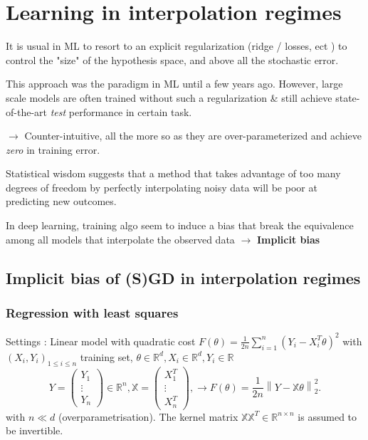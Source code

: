 \chapter{Learning in interpolation regimes}
It is usual in ML to resort to an explicit regularization (ridge / losses, ect ) to control the "size" of the hypothesis space, and above all the stochastic error.
\begin{figure}[H] %
    \centering
\end{figure}

This approach was the paradigm in ML until a few years ago.
However, large scale models are often trained without such a regularization \& still achieve state-of-the-art \textit{test} performance in certain task. 

$\rightarrow$ Counter-intuitive, all the more so as they are over-parameterized and achieve \textit{zero} in training error. 

\begin{figure}[H]%
    \centering
\end{figure}
Statistical wisdom suggests that a method that takes advantage of too many degrees of freedom by perfectly interpolating noisy data will be poor at predicting new outcomes. 

In deep learning, training algo seem to induce a bias that break the equivalence among all models that interpolate the observed data $\rightarrow$ \textbf{Implicit bias}

\section{Implicit bias of (S)GD in interpolation regimes}
\subsection{Regression with least squares}

Settings : Linear model with quadratic cost $ F(\theta ) = \frac{1 }{2n } \sum_{i=1 }^{n } (Y_i - X_i^T \theta )^2 $ with $ (X_i, Y_i)_{1 \leq i \leq n} $ training set, $ \theta \in \mathbb{R}^d, X_i \in \mathbb{R}^d, Y_i \in \mathbb{R} $ 
\[
    Y = \begin{pmatrix}
        Y_1 \\
        \vdots \\
        Y_n
    \end{pmatrix} \in \mathbb{R}^n , \mathbb{X} = \begin{pmatrix}
        X_1^T \\
        \vdots \\
        X_n^T
    \end{pmatrix}, \rightarrow F(\theta) = \frac{1}{2n} \left\| Y - \mathbb{X } \theta  \right\| _2 ^2
.\]
with $ n \ll d $ (overparametrisation). The kernel matrix $ \mathbb{X} \mathbb{X}^T \in \mathbb{R} ^{n \times n} $ is assumed to be invertible. 

